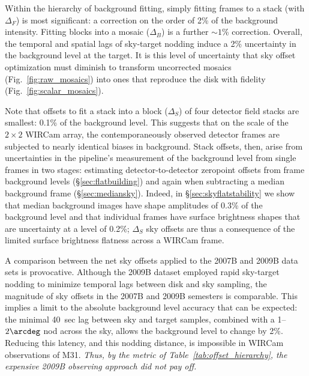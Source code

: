 \documentclass[iop]{emulateapj}
\newcommand{\Fig}[1]{Fig.~\ref{fig:#1}}  %
\newcommand{\Tab}[1]{Table~\ref{tab:#1}}  %
\newcommand{\Sec}[1]{\S\ref{sec:#1}}  %
\begin{document}
Within the hierarchy of background fitting, simply fitting frames to a stack (with $\Delta_F$) is most significant: a correction on the order of 2\% of the background intensity.
Fitting blocks into a mosaic ($\Delta_B$) is a further $\sim 1$\% correction.
Overall, the temporal and spatial lags of sky-target nodding induce a 2\% uncertainty in the background level at the target.
It is this level of uncertainty that sky offset optimization must diminish to transform uncorrected mosaics (\Fig{raw_mosaics}) into ones that reproduce the disk with fidelity (\Fig{scalar_mosaics}).

Note that offsets to fit a stack into a block ($\Delta_S$) of four detector field stacks are smallest: 0.1\% of the background level.
This suggests that on the scale of the $2\times 2$ WIRCam array, the contemporaneously observed detector frames are subjected to nearly identical biases in background.
Stack offsets, then, arise from uncertainties in the pipeline's measurement of the background level from single frames in two stages: estimating detector-to-detector zeropoint offsets from frame background levels (\Sec{flatbuilding}) and again when subtracting a median background frame (\Sec{mediansky}).
Indeed, in \Sec{skyflatstability} we show that median background images have shape amplitudes of 0.3\% of the background level and that individual frames have surface brightness shapes that are uncertainty at a level of 0.2\%; $\Delta_S$ sky offsets are thus a consequence of the limited surface brightness flatness across a WIRCam frame.

A comparison between the net sky offsets applied to the 2007B and 2009B data sets is provocative.
Although the 2009B dataset employed rapid sky-target nodding to minimize temporal lags between disk and sky sampling, the magnitude of sky offsets in the 2007B and 2009B semesters is comparable.
This implies a limit to the absolute background level accuracy that can be expected: the minimal 40~sec lag between sky and target samples, combined with a 1--$2\arcdeg$ nod across the sky, allows the background level to change by 2\%.
Reducing this latency, and this nodding distance, is impossible in WIRCam observations of M31.
\emph{Thus, by the metric of \Tab{offset_hierarchy}, the expensive 2009B observing approach did not pay off.}


\begin{table}[t]
\centering
\caption[Hierarchy of scalar sky offsets]{Hierarchy of scalar sky offsets (using \texttt{FW100K} RT flat fielding, and median background subtraction).
The `Total' sky offsets track the net offset of individual WIRCam image frames into the fitted mosaic.
$\langle I_\mathrm{sky}\rangle$ is taken as the instantaneous background level for the images being sampled (see \Fig{net_sky_level} for the distribution of levels).
Offset distributions are also presented in units of the WIRCam mosaics, DN, corresponding to a zeropoint of 25 mag.}
\label{tab:offset_hierarchy}

\end{table}
\end{document}
